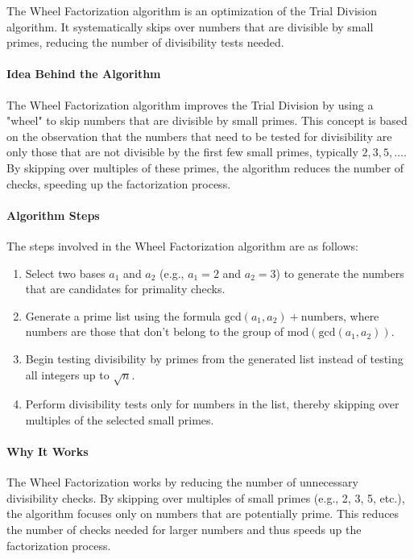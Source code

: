 \documentclass[12pt]{report}
\begin{document}
The Wheel Factorization algorithm is an optimization of the Trial Division algorithm. It systematically skips over numbers that are divisible by small primes, reducing the number of divisibility tests needed.

\paragraph{Idea Behind the Algorithm}

The Wheel Factorization algorithm improves the Trial Division by using a "wheel" to skip numbers that are divisible by small primes. This concept is based on the observation that the numbers that need to be tested for divisibility are only those that are not divisible by the first few small primes, typically $2, 3, 5, \ldots$. By skipping over multiples of these primes, the algorithm reduces the number of checks, speeding up the factorization process.

\paragraph{Algorithm Steps}

The steps involved in the Wheel Factorization algorithm are as follows:

\begin{enumerate}
    \item Select two bases $a_1$ and $a_2$ (e.g., $a_1 = 2$ and $a_2 = 3$) to generate the numbers that are candidates for primality checks.
    \item Generate a prime list using the formula $ \text{gcd}(a_1, a_2) + \text{numbers}$, where numbers are those that don’t belong to the group of $ \text{mod}(\text{gcd}(a_1, a_2))$.
    \item Begin testing divisibility by primes from the generated list instead of testing all integers up to $\sqrt{n}$.
    \item Perform divisibility tests only for numbers in the list, thereby skipping over multiples of the selected small primes.
\end{enumerate}

\paragraph{Why It Works}

The Wheel Factorization works by reducing the number of unnecessary divisibility checks. By skipping over multiples of small primes (e.g., 2, 3, 5, etc.), the algorithm focuses only on numbers that are potentially prime. This reduces the number of checks needed for larger numbers and thus speeds up the factorization process.
\end{document}
